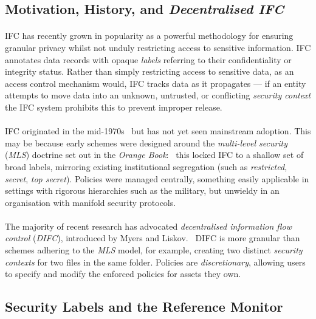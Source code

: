 \subsection{Motivation, History, and \textit{Decentralised IFC}}

\paragraph{} IFC has recently grown in popularity as a powerful methodology for ensuring granular privacy whilst not unduly restricting access to sensitive information. IFC annotates data records with opaque \textit{labels} referring to their confidentiality or integrity status. Rather than simply restricting access to sensitive data, as an access control mechanism would, IFC tracks data as it propagates --- if an entity attempts to move data into an unknown, untrusted, or conflicting \textit{security context} the IFC system prohibits this to prevent improper release.

\paragraph{} IFC originated in the mid-1970s~\cite{ifc-lattice} but has not yet seen mainstream adoption. This may be because early schemes were designed around the \textit{multi-level security} (\textit{MLS}) doctrine set out in the \textit{Orange Book}:~\cite{orange-book} this locked IFC to a shallow set of broad labels, mirroring existing institutional segregation (such as \textit{restricted}, \textit{secret}, \textit{top secret}). Policies were managed centrally, something easily applicable in settings with rigorous hierarchies such as the military, but unwieldy in an organisation with manifold security protocols.

\paragraph{} The majority of recent research has advocated \textit{decentralised information flow control} 
(\textit{DIFC}), introduced by Myers and Liskov.~\cite{difc,10.1145/363516.363526,10.1145/268998.266669} DIFC is more granular than schemes adhering to the \textit{MLS} model, for example, creating two distinct \textit{security contexts} for two files in the same folder. Policies are \textit{discretionary}, allowing users to specify and modify the enforced policies for assets they own.

\subsection{Security Labels and the Reference Monitor}

